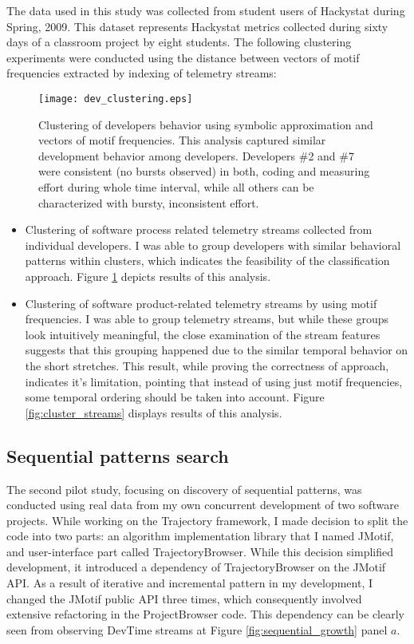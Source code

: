 The data used in this study was collected from student users of Hackystat during Spring, 2009. This dataset represents Hackystat metrics collected during sixty days of a classroom project by eight students. The following clustering experiments were conducted using the distance between vectors of motif frequencies extracted by indexing of telemetry streams:

\begin{figure}[tbp]
   \centering
   \texttt{[image: dev\_clustering.eps]}
   \caption{Clustering of developers behavior using symbolic approximation and vectors of motif frequencies. This analysis captured similar development behavior among developers. Developers \#2 and \#7 were consistent (no bursts observed) in both, coding and measuring effort during whole time interval, while all others can be characterized with bursty, inconsistent effort.}
   \label{fig:cluster_developers}
\end{figure}

\begin{itemize}
	\item Clustering of software process related telemetry streams collected from individual developers. I was able to group developers with similar behavioral patterns within clusters, which indicates the feasibility of the classification approach. Figure \ref{fig:cluster_developers} depicts results of this analysis.
	\item Clustering of software product-related telemetry streams by using motif frequencies. I was able to group telemetry streams, but while these groups look intuitively meaningful, the close examination of the stream features suggests that this grouping happened due to the similar temporal behavior on the short stretches. This result, while proving the correctness of approach, indicates it's limitation, pointing that instead of using just motif frequencies, some temporal ordering should be taken into account. Figure \ref{fig:cluster_streams} displays results of this analysis.
\end{itemize}

\subsection{Sequential patterns search}
The second pilot study, focusing on discovery of sequential patterns, was conducted using real data from my own concurrent development of two software projects. While working on the Trajectory framework, I made decision to split the code into two parts: an algorithm implementation library that I named JMotif, and user-interface part called TrajectoryBrowser. While this decision simplified development, it introduced a dependency of TrajectoryBrowser on the JMotif API. As a result of iterative and incremental pattern in my development, I changed the JMotif public API three times, which consequently involved extensive refactoring in the ProjectBrowser code. This dependency can be clearly seen from observing DevTime streams at Figure \ref{fig:sequential_growth} panel $a$. 

